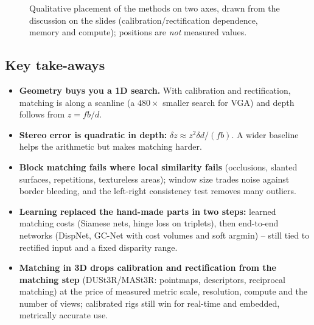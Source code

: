 \documentclass[11pt,a4paper]{article}
\theoremstyle{definition}
\begin{document}
\begin{figure}[H]\centering
{}
\caption{Qualitative placement of the methods on two axes, drawn from the discussion on the slides (calibration/rectification dependence, memory and compute); positions are \emph{not} measured values.}
\end{figure}

\subsection*{Key take-aways}
\begin{itemize}
\item \textbf{Geometry buys you a 1D search.} With calibration and rectification, matching is along a scanline (a $480\times$ smaller search for VGA) and depth follows from $z=fb/d$.
\item \textbf{Stereo error is quadratic in depth:} $\delta z\approx z^2\delta d/(fb)$. A wider baseline helps the arithmetic but makes matching harder.
\item \textbf{Block matching fails where local similarity fails} (occlusions, slanted surfaces, repetitions, textureless areas); window size trades noise against border bleeding, and the left-right consistency test removes many outliers.
\item \textbf{Learning replaced the hand-made parts in two steps:} learned matching costs (Siamese nets, hinge loss on triplets), then end-to-end networks (DispNet, GC-Net with cost volumes and soft argmin) -- still tied to rectified input and a fixed disparity range.
\item \textbf{Matching in 3D drops calibration and rectification from the matching step} (DUSt3R/MASt3R: pointmaps, descriptors, reciprocal matching) at the price of measured metric scale, resolution, compute and the number of views; calibrated rigs still win for real-time and embedded, metrically accurate use.
\end{itemize}
\end{document}
